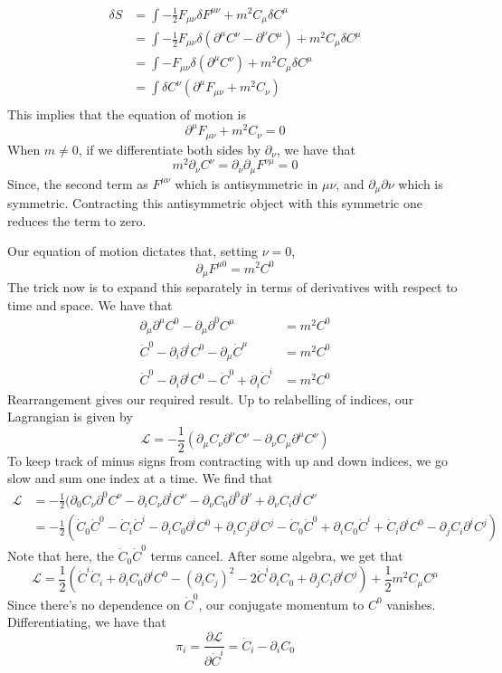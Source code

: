 \documentclass[11pt, oneside]{article}   	%
\theoremstyle{newline}
\theoremstyle{newline}
\theoremstyle{newline}
\theoremstyle{newline}
\theoremstyle{newline}
\begin{document}
\begin{align*} 
\delta S &  = \int - \frac{1}{2} F_{ \mu \nu} \delta F^{ \mu \nu}  + m^2 C_\mu \delta C^\mu \\ 
& = \int  - \frac{1}{2} F_{\mu \nu} \delta \left( \partial^\mu C^\nu - \partial^\nu C^\mu \right)  + m^2 C_\mu \delta C^\mu  \\ 
& = \int   - F_{ \mu \nu} \delta \left( \partial^\mu C^\nu \right)  + m^2 C_\mu \delta C^\mu  \\ 
&= \int  \delta C^\nu \left( \partial^\mu F_{ \mu \nu} + m^2 C_\nu \right) \\ 
\end{align*} 
This implies that the equation of motion is 
\[\partial^\mu  F_{ \mu \nu} + m^2 C_\nu = 0  \]
When $m \neq 0$, if we differentiate both sides by $\partial_\nu$, we have that 
\[ 
m^2 \partial_\nu C^\nu  = \partial_\nu \partial_\mu F^{ \nu\mu} = 0 
\] 
Since, the second term as $F^{ \mu\nu }$ which is antisymmetric in $\mu \nu$, and $\partial_\mu \partial\nu$ which is symmetric. Contracting this antisymmetric object with this symmetric one reduces the term to zero. 

Our equation of motion dictates that, setting $\nu = 0$, 
\[ 
\partial_\mu F^{ \mu 0 } = m^2 C^0 
\] 
The trick now is to expand this separately in terms of derivatives with respect to time and space. We have that 
\begin{align*} 
\partial_\mu \partial^\mu C^0  - \partial_\mu \partial^0 C^\mu  &= m^2 C^0 \\
\ddot{C}^0  - \partial_i \partial^i C^0  - \partial_\mu \dot{C}^\mu &= m^2 C^0 \\
\ddot{C}^0 - \partial_i \partial^i C^0  - \ddot{C}^0 + \partial_i\dot{C}^i &= m^2 C^0
\end{align*} 
Rearrangement gives our required result. 
Up to relabelling of indices, our Lagrangian is given by 
\[ 
\mathcal{L }  = - \frac{ 1}{ 2} ( \partial_\mu C_\nu \partial^\nu C^\nu  - \partial_\nu C_\mu \partial^\mu C^\nu ) 
\] 
To keep track of minus signs from contracting with up and down indices, we go slow and sum one index at a time. We find that 
\begin{align*} 
\mathcal{L} & = - \frac{1}{ 2}( \partial_0 C_\nu \partial^0 C^\nu  - \partial_i C_\nu \partial^i C^\nu  - \partial_\nu C_0 \partial^0 \partial^\nu +  \partial_\nu C_i \partial^i C^\nu \\
&=  - \frac{1}{2}(\dot{C}_0 \dot{C}^0 - \dot{C}_i \dot{C}^i  - \partial_i C_0 \partial^i C^0 + \partial_i C_j \partial^i C^j - \dot{C}_0 \dot{C}^0 + \partial_i C_0 \dot{C}^ i + \dot{C}_i \partial^i C^0  - \partial_j C_i \partial^i C^j )  
\end{align*} 
Note that here, the $\dot{C}_0\dot{C}^0$ terms cancel. After some algebra, we get that 
\[ 
\mathcal{ L } = \frac{1}{ 2}( \dot{ C}^i \dot{C}_i + \partial_i C_0 \partial^i C^0  - (\partial_i C_j)^2 - 2\dot{C}^i \partial_i C_0 + \partial_j C_i \partial^i C^j ) + \frac{1}{ 2} m^2 C_\mu C^\mu  
\] 
Since there's no dependence on $\dot{C}^0 $, our conjugate momentum to $C^0$ vanishes. Differentiating, we have that 
\[ 
\pi_i  = \frac{\partial \mathcal{L}}{ \partial \dot{C}^i }  = \dot{C}_i - \partial_i C_0
\] 
\end{document}
